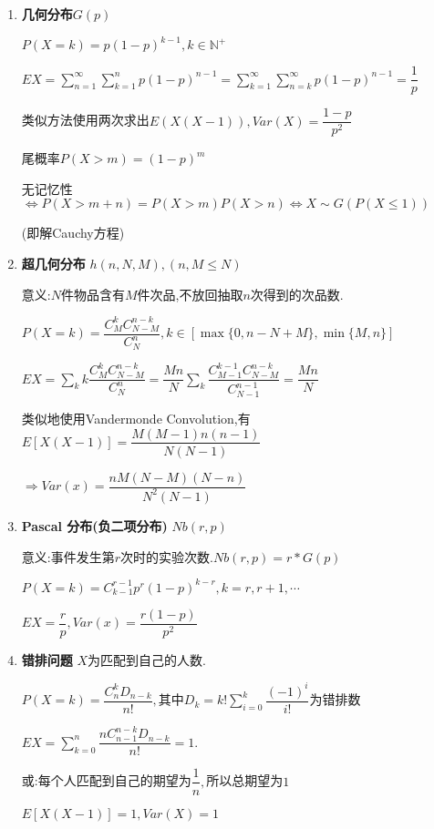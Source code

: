 \begin{enumerate}
	\item \textbf{几何分布}$ G(p)$

		$ P(X=k) = p(1-p)^{k-1}, k \in \mathbb{N^+}$

		$ EX = \sum_{n=1}^{\infty}\sum_{k=1}^{n}{p(1-p)^{n-1}}=
		\sum_{k=1}^{\infty}\sum_{n=k}^{\infty}{p(1-p)^{n-1}}= \dfrac{1}{p}$

		类似方法使用两次求出$ E(X(X-1)),Var(X) = \dfrac{1-p}{p^2}$

		尾概率$ P(X>m) = (1-p)^m$

		无记忆性 $\Leftrightarrow P(X>m+n) = P(X>m)P(X>n)\Leftrightarrow X\sim G(P(X\le 1)) $

		(即解Cauchy方程)

	\item \textbf{超几何分布} $ h(n,N,M),(n, M\le N)$

		意义:$ N$件物品含有$ M$件次品,不放回抽取$ n$次得到的次品数.

		$ P(X=k) = \dfrac{C_M^kC_{N-M}^{n-k}}{C_N^n}, k \in [\max\{0, n-N + M\}, \min\{M,n\}]$

		$ EX = \sum_{k}{k\dfrac{C_M^kC_{N-M}^{n-k}}{C_N^n}}  = \dfrac{Mn}{N}\sum_{k}{\dfrac{C_{M-1}^{k-1}C_{N-M}^{n-k}}{C_{N-1}^{n-1}}} = \dfrac{Mn}{N}$

		类似地使用Vandermonde Convolution,有$ 	E[X(X-1)] = \dfrac{M(M-1)n(n-1)}{N(N-1)}$

		$\Rightarrow Var(x)  = \dfrac{nM(N-M)(N-n)}{N^2(N-1)} $

	\item \textbf{Pascal 分布(负二项分布)} $ Nb(r,p)$

		意义:事件发生第$ r$次时的实验次数.$ Nb(r, p) = r * G(p) $

		$ P(X = k) = C_{k-1}^{r-1}p^r(1-p)^{k-r}, k = r,r+1,\cdots$

		$ EX = \dfrac{r}{p}, Var(x) = \dfrac{r(1-p)}{p^2}$

	\item \textbf{错排问题} $ X $为匹配到自己的人数.

		$ P(X = k) = \dfrac{C_n^kD_{n-k}}{n!}, 其中D_k = k!\sum_{i=0}^{k}{\dfrac{(-1)^i}{i!}}为错排数$

		$ EX = \sum_{k=0}^n{\dfrac{nC_{n-1}^{n-k}D_{n-k}}{n!}} = 1. $ 

		或:每个人匹配到自己的期望为$ \dfrac{1}{n},$所以总期望为$ 1$

		$ E[X(X-1)] = 1, Var(X) = 1$
\end{enumerate}

